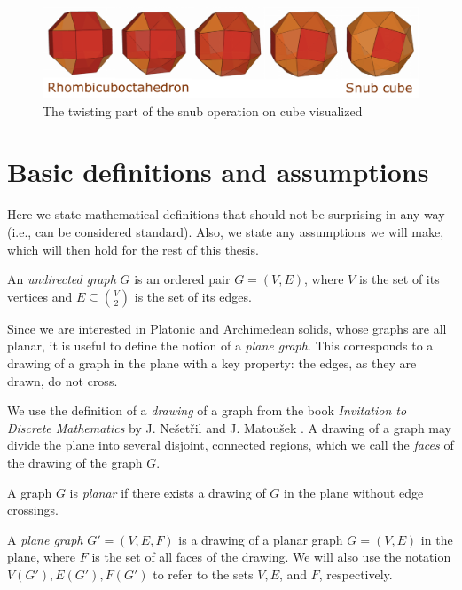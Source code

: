 \begin{description}
\begin{figure}[H]
    \centering
    \includegraphics[width=1\textwidth]{Resources/Figs/op_snub_pdfa.pdf}
    \caption{The twisting part of the snub operation on cube visualized \cite{natal-polyhed-viewer}}
    \label{fig:op_snub}
\end{figure}
    
\end{description}

\section{Basic definitions and assumptions}

Here we state mathematical definitions that should not be surprising in any way (i.e., can be considered standard). Also, we state any assumptions we will make, which will then hold for the rest of this thesis.

\begin{defn}
    An \emph{undirected graph} $G$ is an ordered pair $G = (V,E)$, where $V$ is the set of its vertices and $E \subseteq \binom{V}{2}$ is the set of its edges. 
\end{defn}

Since we are interested in Platonic and Archimedean solids, whose graphs are all planar, it is useful to define the notion of a \textit{plane graph}. This corresponds to a drawing of a graph in the plane with a key property: the edges, as they are drawn, do not cross.

We use the definition of a \textit{drawing} of a graph from the book \textit{Invitation to Discrete Mathematics} by J. Nešetřil and J. Matoušek \cite{matousek2009}. A drawing of a graph may divide the plane into several disjoint, connected regions, which we call the \textit{faces} of the drawing of the graph $G$.

\begin{defn}
    A graph $G$ is \emph{planar} if there exists a drawing of $G$ in the plane without edge crossings.
\end{defn}

\begin{defn}
    A \emph{plane graph} $G' = (V, E, F)$ is a drawing of a planar graph $G = (V, E)$ in the plane, where $F$ is the set of all faces of the drawing. We will also use the notation $V(G'), E(G'), F(G')$ to refer to the sets $V, E$, and $F$, respectively.
\end{defn}

